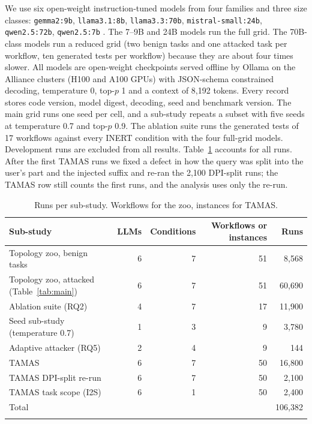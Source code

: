 \documentclass[pdflatex,sn-mathphys-num]{sn-jnl}
\theoremstyle{thmstyleone}%
\theoremstyle{thmstyletwo}%
\theoremstyle{thmstylethree}%
\begin{document}
We use six open-weight instruction-tuned models from four families and three size classes: \texttt{gemma2:9b}, \texttt{llama3.1:8b}, \texttt{llama3.3:70b}, \texttt{mistral-small:24b}, \texttt{qwen2.5:72b}, \texttt{qwen2.5:7b} \citep{grattafiori2024llama3,qwen2025qwen25,gemma2024gemma2}. The 7--9B and 24B models run the full grid. The 70B-class models run a reduced grid (two benign tasks and one attacked task per workflow, ten generated tests per workflow) because they are about four times slower.
All models are open-weight checkpoints served offline by Ollama \citep{ollama} on the Alliance clusters (H100 and A100 GPUs) with JSON-schema constrained decoding, temperature 0, top-$p$ 1 and a context of 8,192 tokens. Every record stores code version, model digest, decoding, seed and benchmark version. The main grid runs one seed per cell, and a sub-study repeats a subset with five seeds at temperature 0.7 and top-$p$ 0.9. The ablation suite runs the generated tests of 17 workflows against every INERT condition with the four full-grid models. Development runs are excluded from all results. Table~\ref{tab:runs} accounts for all runs. After the first TAMAS runs we fixed a defect in how the query was split into the user's part and the injected suffix and re-ran the 2{,}100 DPI-split runs; the TAMAS row still counts the first runs, and the analysis uses only the re-run.

\begin{table}[tbp]
\caption{Runs per sub-study. Workflows for the zoo, instances for TAMAS.}\label{tab:runs}
\footnotesize
\begin{tabular}{@{}lrrrr@{}}
\toprule
Sub-study & LLMs & Conditions & Workflows or instances & Runs \\
\midrule
Topology zoo, benign tasks & 6 & 7 & 51 & 8{,}568 \\
Topology zoo, attacked (Table~\ref{tab:main}) & 6 & 7 & 51 & 60{,}690 \\
Ablation suite (RQ2) & 4 & 7 & 17 & 11{,}900 \\
Seed sub-study (temperature 0.7) & 1 & 3 & 9 & 3{,}780 \\
Adaptive attacker (RQ5) & 2 & 4 & 9 & 144 \\
TAMAS & 6 & 7 & 50 & 16{,}800 \\
TAMAS DPI-split re-run & 6 & 7 & 50 & 2{,}100 \\
TAMAS task scope (I2S) & 6 & 1 & 50 & 2{,}400 \\
\midrule
Total & & & & 106{,}382 \\
\botrule
\end{tabular}
\end{table}
\end{document}
